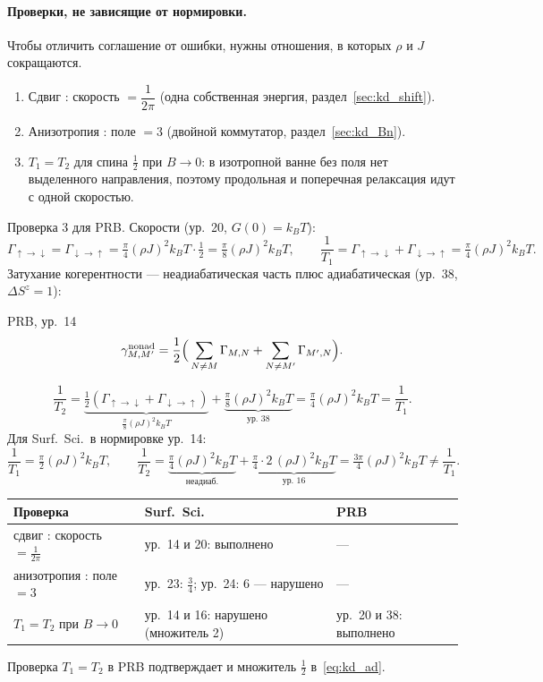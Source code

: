 \paragraph{Проверки, не зависящие от нормировки.} Чтобы отличить соглашение
от ошибки, нужны отношения, в которых $\rho$ и $J$ сокращаются.
\begin{resbox}
\begin{enumerate}
\item Сдвиг : скорость $=\dfrac1{2\pi}$ (одна собственная энергия,
  раздел~\ref{sec:kd_shift}).
\item Анизотропия : поле $=3$ (двойной коммутатор, раздел~\ref{sec:kd_Bn}).
\item $T_1=T_2$ для спина $\tfrac12$ при $B\to0$: в изотропной ванне без поля нет
  выделенного направления, поэтому продольная и поперечная релаксация
  идут с одной скоростью.
\end{enumerate}
\end{resbox}
Проверка 3 для PRB. Скорости (ур.~20, $G(0)=k_BT$):
\[
\Gamma_{\uparrow\to\downarrow}=\Gamma_{\downarrow\to\uparrow}=\tfrac\pi4(\rho J)^2k_BT\cdot\tfrac12=\tfrac\pi8(\rho J)^2k_BT,
\qquad \frac1{T_1}=\Gamma_{\uparrow\to\downarrow}+\Gamma_{\downarrow\to\uparrow}=\tfrac\pi4(\rho J)^2k_BT .
\]
Затухание когерентности --- неадиабатическая часть плюс адиабатическая
(ур.~38, $\Delta S^z=1$):
\begin{paperbox}{PRB, ур.~14}
\[
\gamma^{\rm nonad}_{M,M'}=\frac12\Big(\sum_{N\ne M}\Gamma_{M,N}+\sum_{N\ne M'}\Gamma_{M',N}\Big).
\]
\end{paperbox}
\[
\frac1{T_2}=\underbrace{\tfrac12(\Gamma_{\uparrow\to\downarrow}+\Gamma_{\downarrow\to\uparrow})}_{\frac\pi8(\rho J)^2k_BT}
+\underbrace{\tfrac\pi8(\rho J)^2k_BT}_{\text{ур.~38}}=\tfrac\pi4(\rho J)^2k_BT=\frac1{T_1}.
\]
Для Surf.\ Sci.\ в нормировке ур.~14:
\[
\frac1{T_1}=\tfrac\pi2(\rho J)^2k_BT,\qquad
\frac1{T_2}=\underbrace{\tfrac\pi4(\rho J)^2k_BT}_{\text{неадиаб.}}+\underbrace{\tfrac\pi4\cdot2\,(\rho J)^2k_BT}_{\text{ур.~16}}
=\tfrac{3\pi}4(\rho J)^2k_BT\ne\frac1{T_1}.
\]
\begin{cmpbox}
\begin{center}\small
\begin{tabular}{p{3.4cm}p{5.4cm}p{3.6cm}}
\toprule
Проверка & Surf.\ Sci. & PRB \\
\midrule
сдвиг : скорость $=\tfrac1{2\pi}$ & ур.~14 и 20: выполнено & --- \\
анизотропия : поле $=3$ & ур.~23: $\tfrac34$; ур.~24: 6 --- нарушено & --- \\
$T_1=T_2$ при $B\to0$ & ур.~14 и 16: нарушено (множитель 2) & ур.~20 и 38: выполнено \\
\bottomrule
\end{tabular}
\end{center}
Проверка $T_1=T_2$ в PRB подтверждает и множитель $\tfrac12$ в~\eqref{eq:kd_ad}.
\end{cmpbox}

